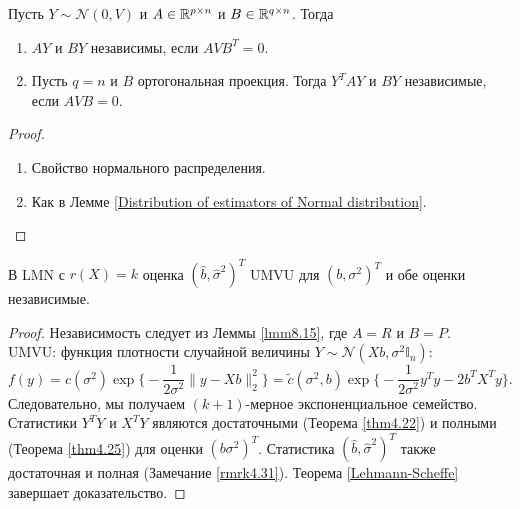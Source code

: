 \begin{lmm} \label{lmm8.15}
	Пусть $Y \sim \mathcal{N}(0, V)$ и $A \in \mathbb{R}^{p \times n}$ и $B \in \mathbb{R}^{q \times n}$. Тогда
	\begin{enumerate}
		\item $AY$ и $BY$ независимы, если $AVB^T = 0$.
		\item Пусть $q = n$ и $B$ ортогональная проекция. Тогда $Y^TAY$ и $BY$ независимые, если $AVB = 0$.
	\end{enumerate}
\end{lmm}
\begin{proof}
	\begin{enumerate}
		\item Свойство нормального распределения.
		\item Как в Лемме \ref{Distribution of estimators of Normal distribution}.
	\end{enumerate}
\end{proof}

\begin{thm} \label{thm8.16}
	В LMN с $r(X)=k$ оценка $(\hat{b}, \hat{\sigma}^2)^T$ UMVU для $(b, \sigma^2)^T$ и обе оценки независимые.
\end{thm}
\begin{proof}
	Независимость следует из Леммы \ref{lmm8.15}, где $A=R$ и $B=P$. \\
	UMVU: функция плотности случайной величины $Y \sim \mathcal{N}(Xb, \sigma^2 \mathbb{I}_n)$:
	\[ f(y) = c(\sigma^2) \exp \Big \{ -\frac{1}{2\sigma^2} \| y - Xb \|_2^2  \Big \} = \widetilde{c}(\sigma^2, b) \exp \Big \{ -\frac{1}{2\sigma^2} y^Ty - 2b^TX^Ty  \Big \}.  \]
	Следовательно, мы получаем $(k+1)$-мерное экспоненциальное семейство. Статистики $Y^TY$ и $X^TY$ являются достаточными (Теорема \ref{thm4.22}) и полными (Теорема \ref{thm4.25}) для оценки $(b \sigma^2)^T$. Статистика $(\hat{b}, \hat{\sigma}^2)^T$ также достаточная и полная (Замечание \ref{rmrk4.31}). Теорема \ref{Lehmann-Scheffe} завершает доказательство.
\end{proof}

